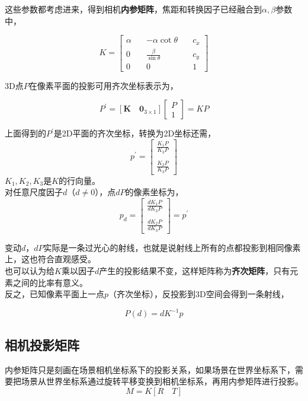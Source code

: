 \documentclass[hpyerref,UTF8,a4paper,titlepage,12pt,oneside]{ctexbook}
\theoremstyle{definition}
\begin{document}
	这些参数都考虑进来，得到相机\textbf{内参矩阵}，焦距和转换因子已经融合到$\alpha,\beta$参数中，

	\begin{equation}
		K = \begin{bmatrix}
			\alpha \quad& -\alpha\cot\theta        \quad& c_x\\
			0      \quad& \frac{\beta}{\sin\theta} \quad& c_y\\
			0      \quad& 0                        \quad& 1
		\end{bmatrix}
	\end{equation}

	3D点$P$在像素平面的投影可用齐次坐标表示为，

	$$
		P^{\prime} = 
			\left[
				\mathbf{K}\quad \mathbf{0}_{3\times 1}
			\right]
		\begin{bmatrix}
			P\\
			1
		\end{bmatrix} = KP
	$$

	上面得到的$P^{\prime}$是2D平面的齐次坐标，转换为2D坐标还需，
	$$
		p^{\prime} = \begin{bmatrix}
			\frac{K_1P}{K_3P}\\
			\\
			\frac{K_2P}{K_3P}
		\end{bmatrix}
	$$
	$K_1,K_2,K_3$是$K$的行向量。\\

	对任意尺度因子$d$（$d\neq 0$），点$dP$的像素坐标为，
	$$
		p_d = \begin{bmatrix}
			\frac{dK_1P}{dK_3P}\\
			\\
			\frac{dK_2P}{dK_3P}
		\end{bmatrix} = p^{\prime}
	$$

	变动$d$，$dP$实际是一条过光心的射线，也就是说射线上所有的点都投影到相同像素上，这也符合直观感受。\\

	也可以认为给$K$乘以因子$d$产生的投影结果不变，这样矩阵称为\textbf{齐次矩阵}，只有元素之间的比率有意义。\\

	反之，已知像素平面上一点$p$（齐次坐标），反投影到3D空间会得到一条射线，

	\begin{equation}
		P(d) = dK^{-1}p \label{inverse_proj}
	\end{equation}

\subsection{相机投影矩阵}
	内参矩阵只是刻画在场景相机坐标系下的投影关系，如果场景在世界坐标系下，需要把场景从世界坐标系通过旋转平移变换到相机坐标系，再用内参矩阵进行投影。
	$$
		M = K\left[R\quad T\right]
	$$
\end{document}
